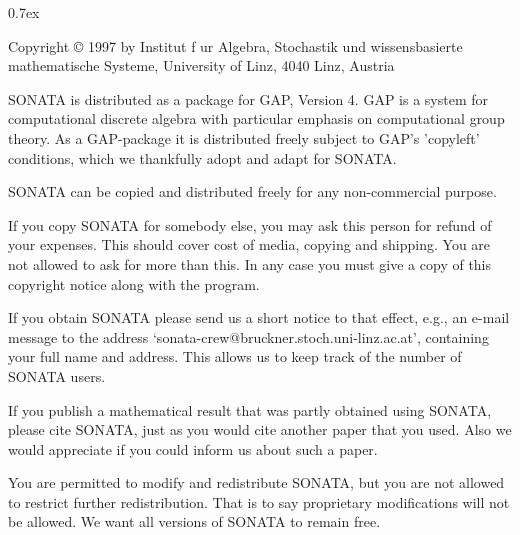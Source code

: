 


\begingroup
\def\"#1{\accent127 #1}
\parindent 0pt
\parskip 0.7ex

{\everypar{\hangindent\manindent}
Copyright {\copyright} 1997 by\hfill\break
        Institut f\"ur Algebra, Stochastik und
        wissensbasierte mathematische Systeme,\hfill\break
        University of Linz, 4040 Linz, Austria}

\medskip

SONATA  is  distributed as a package for GAP, Version 4.  GAP  is a
system  for  computational  discrete algebra with  particular emphasis on
computational  group  theory.  As a GAP-package it  is  distributed
freely subject to GAP's 'copyleft' conditions, which  we thankfully adopt
and adapt for SONATA. 

SONATA   can be copied   and  distributed freely  for any  non-commercial
purpose.

If you copy SONATA for somebody else, you may ask this person for  refund
of your expenses.  This should cover cost of media, copying and shipping.
You are not allowed to ask for more than this.  In any case you must give
a copy of this copyright notice along with the program.

If you obtain SONATA please send us  a short notice to that effect, e.g.,
an  e-mail  message   to  the  address
`sonata-crew@bruckner.stoch.uni-linz.ac.at',
containing your full  name and address.  This  allows us to keep track of
the number of SONATA users.

If you  publish  a mathematical  result  that  was  partly obtained using
SONATA, please cite SONATA, just as you would cite another paper that you
used.\* Also   we would appreciate if you   could inform us  about such a
paper.

You  are permitted  to modify and  redistribute  SONATA,  but you are not
allowed  to restrict further redistribution.  That is to say  proprietary
modifications will  not  be allowed.  We want all  versions  of SONATA to
remain free.

